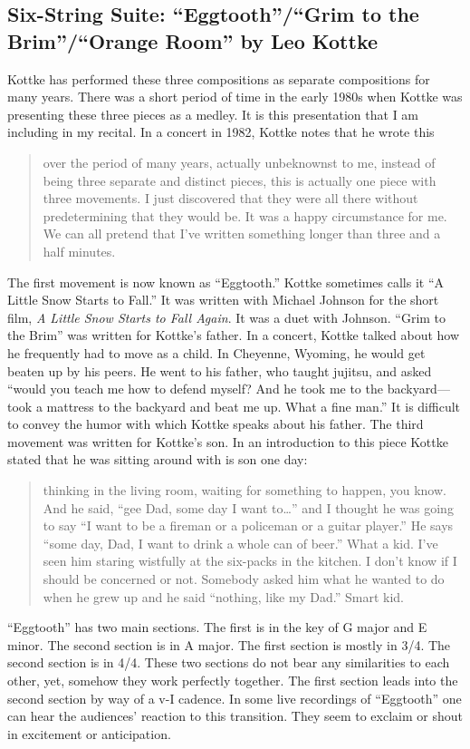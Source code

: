 \documentclass{tufte-handout}
\begin{document}
\subsection*{Six-String Suite: ``Eggtooth''/``Grim to the Brim''/``Orange Room'' by Leo Kottke}
Kottke has performed these three compositions as separate compositions for many years. There was a short period of time in the early 1980s when Kottke was presenting these three pieces as a medley. It is this presentation that I am including in my recital. In a concert in 1982, Kottke notes that he wrote this
\begin{quote}
over the period of many years, actually unbeknownst to me, instead of being three separate and distinct pieces, this is actually one piece with three movements. I just discovered that they were all there without predetermining that they would be. It was a happy circumstance for me. We can all pretend that I've written something longer than three and a half minutes.
\end{quote}
The first movement is now known as ``Eggtooth.'' Kottke sometimes calls it ``A Little Snow Starts to Fall.'' It was written with Michael Johnson for the short film, \emph{A Little Snow Starts to Fall Again}. It was a duet with Johnson. ``Grim to the Brim'' was written for Kottke's father. In a concert, Kottke talked about how he frequently had to move as a child. In Cheyenne, Wyoming, he would get beaten up by his peers. He went to his father, who taught jujitsu, and asked ``would you teach me how to defend myself? And he took me to the backyard—took a mattress to the backyard and beat me up. What a fine man.'' It is difficult to convey the humor with which Kottke speaks about his father. The third movement was written for Kottke's son. In an introduction to this piece Kottke stated that he was sitting around with is son one day:
\begin{quote}
  thinking in the living room, waiting for something to happen, you know. And he said, ``gee Dad, some day I want to…'' and I thought he was going to say ``I want to be a fireman or a policeman or a guitar player.'' He says ``some day, Dad, I want to drink a whole can of beer.'' What a kid. I've seen him staring wistfully at the six-packs in the kitchen. I don't know if I should be concerned or not. Somebody asked him what he wanted to do when he grew up and he said ``nothing, like my Dad.'' Smart kid.
\end{quote}

``Eggtooth'' has two main sections. The first is in the key of G major and E minor. The second section is in A major. The first section is mostly in 3/4. The second section is in 4/4. These two sections do not bear any similarities to each other, yet, somehow they work perfectly together. The first section leads into the second section by way of a v-I cadence. In some live recordings of ``Eggtooth'' one can hear the audiences' reaction to this transition. They seem to exclaim or shout in excitement or anticipation.
\end{document}
